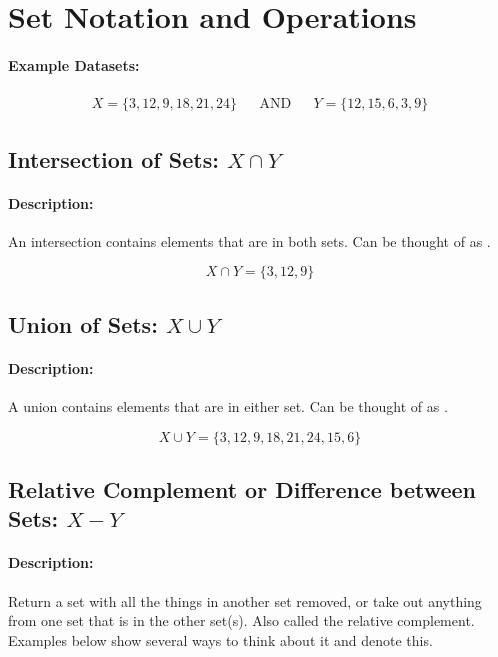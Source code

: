 \documentclass[12pt]{article}
\begin{document}
\section*{Set Notation and Operations}

\paragraph{Example Datasets:}
\begin{align*}
  X = \{3, 12, 9, 18, 21, 24\} && \text{AND} &&
  Y = \{12, 15, 6, 3, 9\}
\end{align*}

\subsection{Intersection of Sets: $X \cap Y$}
\paragraph{Description:} An intersection contains elements that are in both sets. Can be thought of as .

\begin{equation}
  X \cap Y = \{3, 12, 9\}
\end{equation}%

\subsection{Union of Sets: $X \cup Y$}
\paragraph{Description:} A union contains elements that are in either set. Can be thought of as .

\begin{equation}
  X \cup Y = \{3, 12, 9, 18, 21, 24, 15, 6\}
\end{equation}%

\subsection{Relative Complement or Difference between Sets: $X - Y$}
\paragraph{Description:} Return a set with all the things in another set removed, or take out anything from one set that is in the other set(s). Also called the relative complement. Examples below show several ways to think about it and denote this. %
\end{document}

